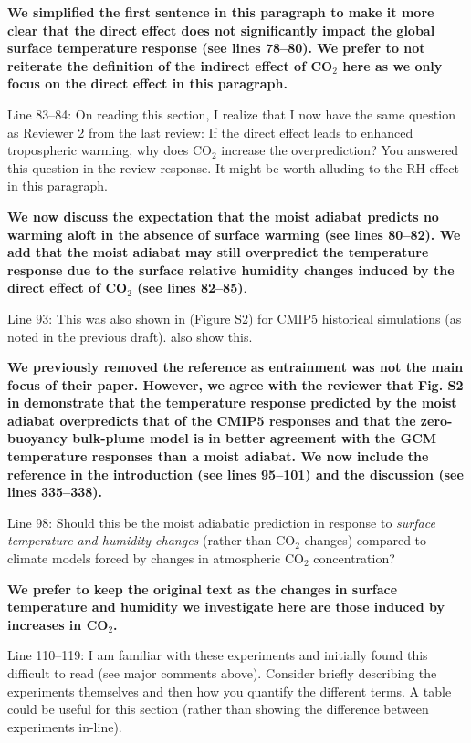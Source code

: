 \documentclass[11pt]{article}
\begin{document}
\textbf{We simplified the first sentence in this paragraph to make it more clear that the direct effect does not significantly impact the global surface temperature response (see lines 78--80). We prefer to not reiterate the definition of the indirect effect of CO\(_2\) here as we only focus on the direct effect in this paragraph.}

Line 83--84: On reading this section, I realize that I now have the same question as Reviewer 2 from the last review: If the direct effect leads to enhanced tropospheric warming, why does CO\(_2\) increase the overprediction? You answered this question in the review response. It might be worth alluding to the RH effect in this paragraph.

\textbf{We now discuss the expectation that the moist adiabat predicts no warming aloft in the absence of surface warming (see lines 80--82). We add that the moist adiabat may still overpredict the temperature response due to the surface relative humidity changes induced by  the direct effect of CO\(_2\) (see lines 82--85)}.

Line 93: This was also shown in \cite{po-chedley2019} (Figure S2) for CMIP5 historical simulations (as noted in the previous draft). \cite{santer2005} also show this.

\textbf{We previously removed the} \cite{po-chedley2019} \textbf{reference as entrainment was not the main focus of their paper. However, we agree with the reviewer that Fig. S2 in} \cite{po-chedley2019} \textbf{ demonstrate that the temperature response predicted by the moist adiabat overpredicts that of the CMIP5 responses and that the zero-buoyancy bulk-plume model is in better agreement with the GCM temperature responses than a moist adiabat. We now include the} \cite{po-chedley2019} \textbf{reference in the introduction (see lines 95--101) and the discussion (see lines 335--338).}

Line 98: Should this be the moist adiabatic prediction in response to \emph{surface temperature and humidity changes} (rather than CO\(_2\) changes) compared to climate models forced by changes in atmospheric CO\(_2\) concentration?

\textbf{We prefer to keep the original text as the changes in surface temperature and humidity we investigate here are those induced by increases in CO\(_2\).}

Line 110--119: I am familiar with these experiments and initially found this difficult to read (see major comments above). Consider briefly describing the experiments themselves and then how you quantify the different terms. A table could be useful for this section (rather than showing the difference between experiments in-line).
\end{document}

